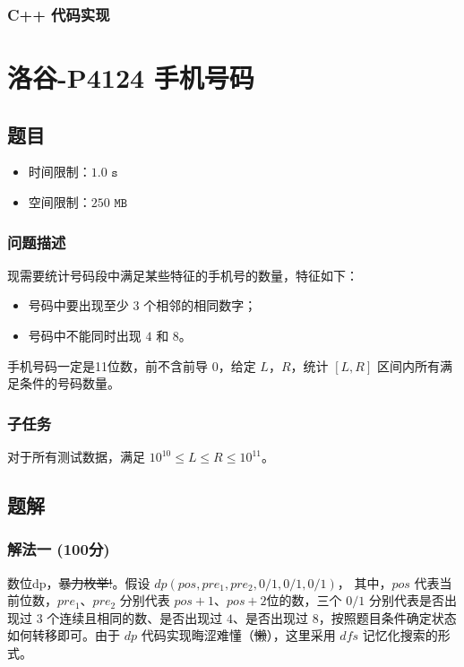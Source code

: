 \documentclass[UTF8, 12pt, a4paper, oneside]{ctexart}
\begin{document}
\subsubsection{C++ 代码实现}


\section{洛谷-P4124 手机号码}
\subsection{题目}
\begin{itemize}
    \item 时间限制：$1.0\texttt{ s}$
    \item 空间限制：$250\texttt{ MB}$
\end{itemize}
\subsubsection{问题描述}
\par 现需要统计号码段中满足某些特征的手机号的数量，特征如下：
\begin{itemize}
    \item 号码中要出现至少 $3$ 个相邻的相同数字；
    \item 号码中不能同时出现 $4$ 和 $8$。
\end{itemize}
\par 手机号码一定是11位数，前不含前导 $0$，给定 $L$，$R$，统计 $[L, R]$ 区间内所有满足条件的号码数量。
\subsubsection{子任务}
\par 对于所有测试数据，满足 $10^10 \leq L \leq R \leq 10^11$。
\subsection{题解}
\subsubsection{解法一 (100分)}
\par 数位dp，\sout{暴力枚举!}。假设 $dp(pos, pre_1, pre_2, 0/1, 0/1, 0/1)$， 其中，$pos$ 代表当前位数，$pre_1$、$pre_2$ 分别代表 $pos+1$、$pos+2$位的数，三个 $0/1$ 分别代表是否出现过 $3$ 个连续且相同的数、是否出现过 $4$、是否出现过 $8$，按照题目条件确定状态如何转移即可。由于 $dp$ 代码实现晦涩难懂（\sout{懒}），这里采用 $dfs$ 记忆化搜索的形式。
\end{document}
